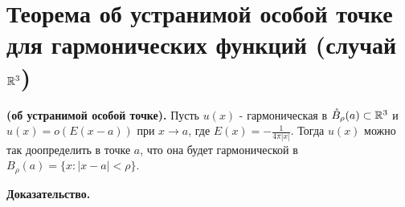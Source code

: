 \section{Теорема об устранимой особой точке для гармонических функций (случай $\mathbb{R}^3$)}
 

\begin{theorem}

{\bf (об  устранимой особой точке).} 
Пусть $u(x)$ - гармоническая в $\mathring{B}_\rho(a) \subset 
\mathbb{R}^3$ и $u(x)=o(E(x-a))$ при $x \to a$, где $E(x) = -\frac{1}{4 \pi |x|}$. Тогда $u(x)$ можно так доопределить в точке $a$, что она будет гармонической в $B_\rho(a) = \{x: |x-a|<\rho \}$.

\end{theorem}

\textbf{Доказательство.}



